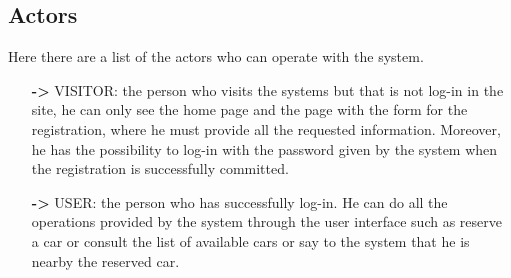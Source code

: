 \subsection{Actors} \label{subsec:actors}
Here there are a list of the actors who can operate with the system.
\begin{itemize}
\item[\textbf{->}] VISITOR: the person who visits the systems but that is not log-in in the site, he can only see the home page and the page with the form for the registration, where he must provide all the requested information. Moreover, he has the possibility to log-in with the password given by the system when the registration is successfully committed. 
\item[\textbf{->}] USER: the person who has successfully log-in. He can do all the operations provided by the system through the user interface such as reserve a car or consult the list of available cars or say to the system that he is nearby the reserved car. 
\end{itemize}

